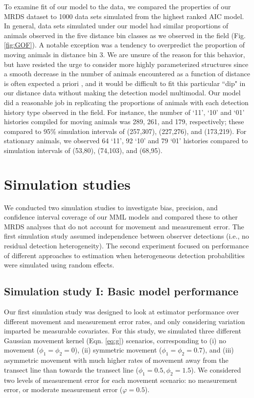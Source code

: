 \documentclass[12pt,fleqn]{article}
\begin{document}
To examine fit of our model to the data, we compared the properties of our MRDS dataset to 1000 data sets simulated from the highest ranked AIC model.  In general, data sets simulated under our model had similar proportions of animals observed in the five distance bin classes as we observed in the field (Fig. \ref{fig:GOF}).  A notable exception was a tendency to overpredict the proportion of moving animals in distance bin 3.  We are unsure of the reason for this behavior, but have resisted the urge to consider more highly parameterized structures since a smooth decrease in the number of animals encountered as a function of distance is often expected a priori \citep{BucklandEtAl2001}, and it would be difficult to fit this particular ``dip" in our distance data without making the detection model multimodal.  Our model did a reasonable job in replicating the proportions of animals with each detection history type observed in the field.  For instance, the number of `11', `10' and `01' histories compiled for moving animals was 289, 261, and 179, respectively; these compared to 95\% simulation intervals of (257,307), (227,276), and (173,219).  For stationary animals, we observed 64 `11', 92 `10' and 79 `01' histories compared to simulation intervals of (53,80), (74,103), and (68,95).


\section{Simulation studies}

We conducted two simulation studies to investigate bias, precision, and confidence interval coverage of our MML models and compared these to other MRDS analyses that do not account for movement and measurement error.  The first simulation study assumed independence between observer detections (i.e., no residual detection heterogeneity).  The second experiment focused on performance of different approaches to estimation when heterogeneous detection probabilities were simulated using random effects.

\subsection{Simulation study I: Basic model performance}

Our first simulation study was designed to look at estimator performance over different movement and measurement error rates, and only considering variation imparted be measurable covariates.  For this study, we simulated  three different Gaussian movement kernel (Eqn. \ref{eq:g}) scenarios, corresponding to (i) no movement ($\phi_1 = \phi_2 = 0$), (ii) symmetric movement ($\phi_1 = \phi_2 = 0.7$), and (iii) asymmetric movement with much higher rates of movement away from the transect line than towards the transect line ($\phi_1 = 0.5, \phi_2 = 1.5$).  We considered two levels of measurement error for each movement scenario: no measurement error, or moderate measurement error ($\varphi = 0.5$).
\end{document}
